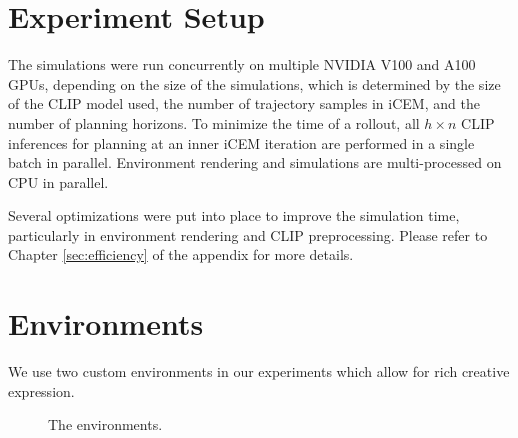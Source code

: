 \section{Experiment Setup}
\label{sec:experiment-setup}

The simulations were run concurrently on multiple NVIDIA V100 and A100 GPUs, depending on the size of the simulations, which is determined by the size of the CLIP model used, the number of trajectory samples in iCEM, and the number of planning horizons.
To minimize the time of a rollout, all \(h \times n\) CLIP inferences for planning at an inner iCEM iteration are performed in a single batch in parallel.
Environment rendering and simulations are multi-processed on CPU in parallel.

Several optimizations were put into place to improve the simulation time, particularly in environment rendering and CLIP preprocessing.
Please refer to Chapter \ref{sec:efficiency} of the appendix for more details.

\section{Environments}
\label{sec:environments}
We use two custom environments in our experiments which allow for rich creative expression.

\begin{figure}[H]
    \centering
    \qquad
    \caption{The environments.}
    \label{fig:environments}
\end{figure}

